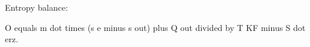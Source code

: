 Entropy balance:  

O equals m dot times (s e minus s out) plus Q out divided by T KF minus S dot erz.